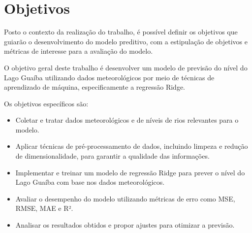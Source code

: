 \section{Objetivos}

Posto o contexto da realização do trabalho, é possível definir os objetivos que guiarão o desenvolvimento do modelo preditivo, com a estipulação de objetivos e métricas de interesse para a avaliação do modelo.

O objetivo geral deste trabalho é desenvolver um modelo de previsão do nível do Lago Guaíba utilizando dados meteorológicos por meio de técnicas de aprendizado de máquina, especificamente a regressão Ridge.

Os objetivos específicos são:

\begin{itemize}
    \item Coletar e tratar dados meteorológicos e de níveis de rios relevantes para o modelo.
    \item Aplicar técnicas de pré-processamento de dados, incluindo limpeza e redução de dimensionalidade, para garantir a qualidade das informações.
    \item Implementar e treinar um modelo de regressão Ridge para prever o nível do Lago Guaíba com base nos dados meteorológicos.
    \item Avaliar o desempenho do modelo utilizando métricas de erro como MSE, RMSE, MAE e R².
    \item Analisar os resultados obtidos e propor ajustes para otimizar a previsão.
\end{itemize}